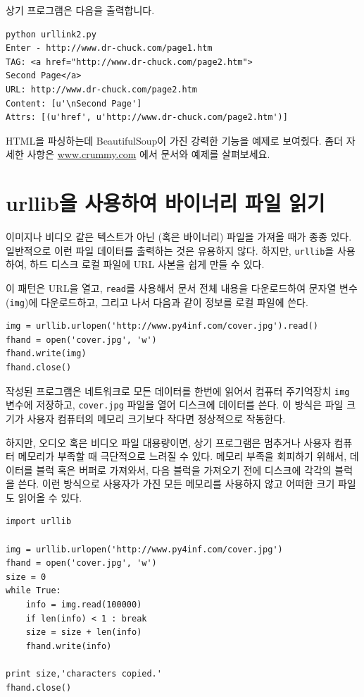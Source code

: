 상기 프로그램은 다음을 출력합니다.

\beforeverb
\begin{verbatim}
python urllink2.py 
Enter - http://www.dr-chuck.com/page1.htm
TAG: <a href="http://www.dr-chuck.com/page2.htm">
Second Page</a>
URL: http://www.dr-chuck.com/page2.htm
Content: [u'\nSecond Page']
Attrs: [(u'href', u'http://www.dr-chuck.com/page2.htm')]
\end{verbatim}
\afterverb
%

HTML을 파싱하는데 BeautifulSoup이 가진 강력한 기능을 예제로 보여줬다.
좀더 자세한 사항은 \url{www.crummy.com} 에서 문서와 예제를 살펴보세요.

\section{urllib을 사용하여 바이너리 파일 읽기}

이미지나 비디오 같은 텍스트가 아닌 (혹은 바이너리) 파일을 가져올 때가 종종 있다.
일반적으로 이런 파일 데이터를 출력하는 것은 유용하지 않다. 
하지만, {\tt urllib}을 사용하여, 하드 디스크 로컬 파일에 URL 사본을 쉽게 만들 수 있다.


이 패턴은 URL을 열고, {\tt read}를 사용해서 문서 전체 내용을 다운로드하여 문자열 변수({\tt img})에 다운로드하고,
그리고 나서 다음과 같이 정보를 로컬 파일에 쓴다.

\beforeverb
\begin{verbatim}
img = urllib.urlopen('http://www.py4inf.com/cover.jpg').read()
fhand = open('cover.jpg', 'w')
fhand.write(img)
fhand.close()
\end{verbatim}
\afterverb
%

작성된 프로그램은 네트워크로 모든 데이터를 한번에 읽어서 컴퓨터 주기억장치 {\tt img} 변수에 저장하고,
{\tt cover.jpg} 파일을 열어 디스크에 데이터를 쓴다. 
이 방식은 파일 크기가 사용자 컴퓨터의 메모리 크기보다 작다면 정상적으로 작동한다.

하지만, 오디오 혹은 비디오 파일 대용량이면, 상기 프로그램은 멈추거나 사용자 컴퓨터 메모리가 부족할 때 극단적으로 느려질 수 있다.
메모리 부족을 회피하기 위해서, 데이터를 블럭 혹은 버퍼로 가져와서, 다음 블럭을 가져오기 전에 디스크에 각각의 블럭을 쓴다.
이런 방식으로 사용자가 가진 모든 메모리를 사용하지 않고 어떠한 크기 파일도 읽어올 수 있다.

\beforeverb
\begin{verbatim}
import urllib

img = urllib.urlopen('http://www.py4inf.com/cover.jpg')
fhand = open('cover.jpg', 'w')
size = 0
while True:
    info = img.read(100000)
    if len(info) < 1 : break
    size = size + len(info)
    fhand.write(info)

print size,'characters copied.'
fhand.close()
\end{verbatim}
\afterverb
%

